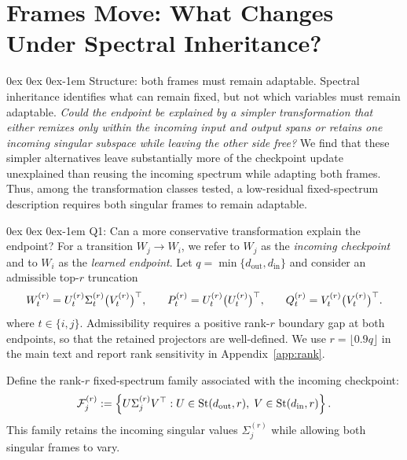\documentclass[11pt, a4paper]{utda}
\makeatletter
\renewcommand{\paragraph}{%
  \@startsection{paragraph}{4}%
  {\z@}{0ex \@plus 0ex \@minus 0ex}{-1em}%
  {\normalfont\normalsize\bfseries}%
}
\theoremstyle{plain}
\theoremstyle{definition}
\theoremstyle{remark}
\makeatother
\begin{document}
\section{Frames Move: What Changes Under Spectral Inheritance?}
\label{sec:transport}


\paragraph{Structure: both frames must remain adaptable.}
Spectral inheritance identifies what can remain fixed, but not which variables
must remain adaptable. \textit{Could the endpoint be explained by a simpler
transformation that either remixes only within the incoming input and output
spans or retains one incoming singular subspace while leaving the other side free?}
We find that these simpler alternatives leave substantially more of the
checkpoint update unexplained than reusing the incoming spectrum while adapting
both frames. Thus, among the transformation classes tested, a low-residual
fixed-spectrum description requires both singular frames to remain adaptable.

\paragraph{Q1: Can a more conservative transformation explain the endpoint?}
For a transition $W_j\rightarrow W_i$, we refer to $W_j$ as the
\emph{incoming checkpoint} and to $W_i$ as the \emph{learned endpoint}.
Let $q=\min\{d_{\mathrm{out}},d_{\mathrm{in}}\}$ and consider an admissible
top-$r$ truncation
\begin{equation}
\small
\label{eq:transport_truncation}
    W_t^{(r)}
    =
    U_t^{(r)}\Sigma_t^{(r)}
    \bigl(V_t^{(r)}\bigr)^\top,
    \qquad
    P_t^{(r)}
    =
    U_t^{(r)}\bigl(U_t^{(r)}\bigr)^\top,
    \qquad
    Q_t^{(r)}
    =
    V_t^{(r)}\bigl(V_t^{(r)}\bigr)^\top .
\end{equation}
where $t\in\{i,j\}$.
Admissibility requires a positive rank-$r$ boundary gap at both endpoints, so
that the retained projectors are well-defined. We use
$r=\lfloor0.9q\rfloor$ in the main text and report rank sensitivity in
Appendix~\ref{app:rank}.

Define the rank-$r$ fixed-spectrum family associated with the incoming
checkpoint:
\begin{equation}
\label{eq:truncated_fixed_spectrum_family}
\small
    \mathcal F_j^{(r)}
    :=
    \left\{
        U\Sigma_j^{(r)}V^\top:
        U\in\mathrm{St}(d_{\mathrm{out}},r),
        \;
        V\in\mathrm{St}(d_{\mathrm{in}},r)
    \right\}.
\end{equation}
This family retains the incoming singular values $\Sigma_j^{(r)}$ while
allowing both singular frames to vary.
\end{document}
